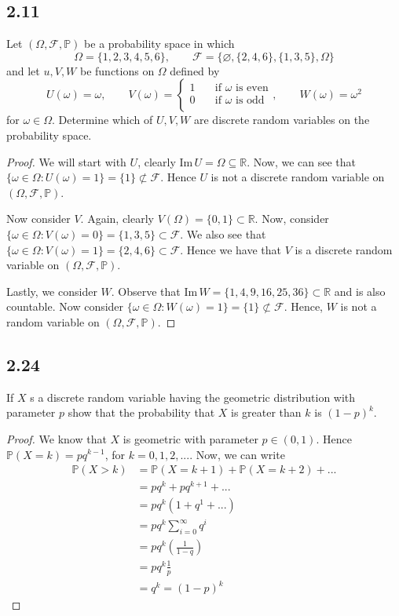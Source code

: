 \documentclass{article}
\newcommand{\R}{\mathbb{R}}
\newcommand{\F}{\mathcal{F}}
\renewcommand{\P}[1]{\mathbb{P}(#1)}
\newcommand{\probspace}{(\Omega, \mathcal{F}, \mathbb{P})}
\newcommand{\Image}[1]{\text{Im}\, #1}
\begin{document}
    \subsection*{2.11}
    Let $\probspace$ be a probability space in which
    $$\Omega = \{1,2,3,4,5,6\}, \qquad \F = \{\varnothing, \{2,4,6\}, \{1,3,5\}, \Omega\}$$
    and let $u, V, W$ be functions on $\Omega$ defined by
    $$U(\omega)= \omega, \qquad V(\omega) = \begin{cases}
        1 \quad &\text{if $\omega$ is even} \\
        0 \quad &\text{if $\omega$ is odd} \\
    \end{cases}, \qquad
    W(\omega)= \omega ^2$$
    for $\omega \in \Omega$. Determine which of $U, V, W$ are discrete random variables
    on the probability space.
    \begin{proof}
        We will start with $U$, clearly $\Image{U} = \Omega \subseteq \R$.
        Now, we can see that $\{\omega \in \Omega: U(\omega) = 1\} = \{1\} \not \subset \F$.
        Hence $U$ is not a discrete random variable on $\probspace$.

        Now consider $V$. Again, clearly $V(\Omega) = \{0,1\} \subset \R$.
        Now, consider $\{\omega \in \Omega: V(\omega)=0\} = \{1,3,5\} \subset \F$. We
        also see that $\{\omega \in \Omega: V(\omega)=1\} = \{2,4,6\} \subset \F$. Hence
        we have that $V$ is a discrete random variable on $\probspace$.

        Lastly, we consider $W$. Observe that $\Image{W} = \{1,4,9,16,25,36\} \subset \R$
        and is also countable. Now consider 
        $\{\omega \in \Omega: W(\omega) = 1\} = \{1\} \not \subset \F$. Hence, $W$ is not
        a random variable on $\probspace$.
    \end{proof}
    \subsection*{2.24}
    If $X$ s a discrete random variable having the geometric distribution with parameter
    $p$ show that the probability that $X$ is greater than $k$ is $(1-p)^k$.
    \begin{proof}
        We know that $X$ is geometric with parameter $p \in (0,1)$. Hence
        $\P{X=k} = pq^{k-1}$, for $k=0,1,2,...$. Now, we can write
        \begin{align*}
            \P{X > k} &= \P{X = k + 1} + \P{X = k + 2} + ... \\
                &= pq^{k} + pq^{k + 1} + ... \\
                &= pq^k(1+q^1 + ...) \\
                &= pq^k \sum_{i = 0}^{\infty}q^i \\
                &= pq^k \left(\frac{1}{1 - q}\right) \\
                &= pq^k\frac{1}{p} \\
                &= q^k = (1-p)^k
        \end{align*}
    \end{proof}
\end{document}
